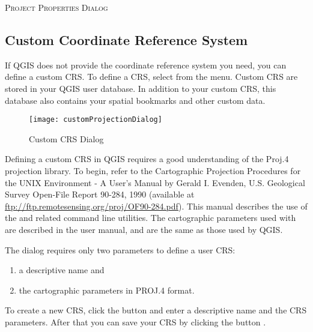 \begin{Tip}
 \caption{\textsc{Project Properties Dialog}}
\end{Tip}

\subsection{Custom Coordinate Reference System}\label{sec:customprojections}

If QGIS does not provide the coordinate reference system you need, you
can define a custom CRS. To define a CRS, select
 from the  menu.
Custom CRS are stored in your QGIS user database. In addition to your custom
CRS, this database also contains your spatial bookmarks and other custom data. 

\begin{figure}[ht]
   \begin{center}
   \caption{Custom CRS Dialog \nixcaption}\label{fig:customprojections}\smallskip
   \texttt{[image: customProjectionDialog]}
\end{center}  
\end{figure}

Defining a custom CRS in QGIS requires a good understanding of the Proj.4
projection library. To begin, refer to the Cartographic Projection Procedures
for the UNIX Environment - A User's Manual by Gerald I. Evenden, U.S.
Geological Survey Open-File Report 90-284, 1990 (available at \url{ftp://ftp.remotesensing.org/proj/OF90-284.pdf}).
This manual describes the use of the  and related command line
utilities. The cartographic parameters used with  are
described in the user manual, and are the same as those used by QGIS. 

The  dialog requires
only two parameters to define a user CRS: 
\begin{enumerate}
\item a descriptive name and
\item the cartographic parameters in PROJ.4 format.
\end{enumerate}
To create a new CRS, click the  button and enter a
descriptive name and the CRS parameters. After that you can save your CRS by
clicking the button .

